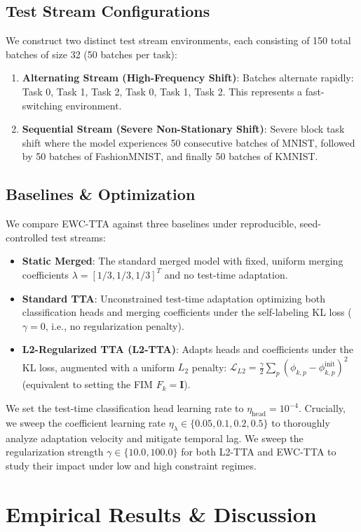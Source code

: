 \documentclass{article}
\theoremstyle{plain}
\theoremstyle{definition}
\theoremstyle{remark}
\begin{document}
\subsection{Test Stream Configurations}
We construct two distinct test stream environments, each consisting of 150 total batches of size 32 (50 batches per task):
\begin{enumerate}
    \item \textbf{Alternating Stream (High-Frequency Shift)}: Batches alternate rapidly: Task 0, Task 1, Task 2, Task 0, Task 1, Task 2. This represents a fast-switching environment.
    \item \textbf{Sequential Stream (Severe Non-Stationary Shift)}: Severe block task shift where the model experiences 50 consecutive batches of MNIST, followed by 50 batches of FashionMNIST, and finally 50 batches of KMNIST.
\end{enumerate}

\subsection{Baselines \& Optimization}
We compare EWC-TTA against three baselines under reproducible, seed-controlled test streams:
\begin{itemize}
    \item \textbf{Static Merged}: The standard merged model with fixed, uniform merging coefficients $\lambda = [1/3, 1/3, 1/3]^T$ and no test-time adaptation.
    \item \textbf{Standard TTA}: Unconstrained test-time adaptation optimizing both classification heads and merging coefficients under the self-labeling KL loss ($\gamma=0$, i.e., no regularization penalty).
    \item \textbf{L2-Regularized TTA (L2-TTA)}: Adapts heads and coefficients under the KL loss, augmented with a uniform $L_2$ penalty: $\mathcal{L}_{L2} = \frac{\gamma}{2} \sum_p (\phi_{k, p} - \phi_{k, p}^{\text{init}})^2$ (equivalent to setting the FIM $F_k = \mathbf{I}$).
\end{itemize}
We set the test-time classification head learning rate to $\eta_{\text{head}} = 10^{-4}$. Crucially, we sweep the coefficient learning rate $\eta_{\lambda} \in \{0.05, 0.1, 0.2, 0.5\}$ to thoroughly analyze adaptation velocity and mitigate temporal lag. We sweep the regularization strength $\gamma \in \{10.0, 100.0\}$ for both L2-TTA and EWC-TTA to study their impact under low and high constraint regimes.

\section{Empirical Results \& Discussion}
\label{submission-results}
\end{document}
